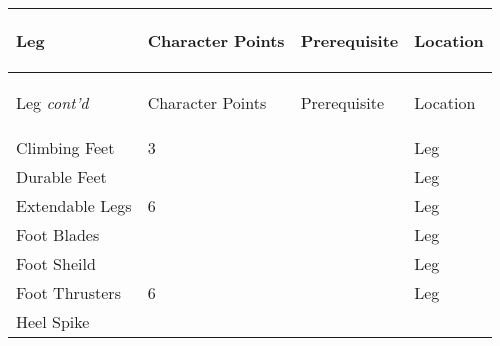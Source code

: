 \documentclass[twoside]{book}
\begin{document}
\begin{longtable}{p{1.25in}p{2em}ll} 
  Leg
  &
  \begin{turn}{70}{Character Points}\end{turn}
          
  &
  \begin{turn}{70}{Prerequisite}\end{turn}
          
  &
  \begin{turn}{70}{Location}\end{turn}
          
  \\
  \hline
  \hline
  \endfirsthead
  Leg \textit{cont'd}
        
  &
  \begin{turn}{70}{Character Points}\end{turn}
          
  &
  \begin{turn}{70}{Prerequisite}\end{turn}
          
  &
  \begin{turn}{70}{Location}\end{turn}
          
  \\
  \hline
  \endhead
      
  \raggedright
           Climbing Feet 
  &
   3 
  &
  
  &
   Leg 
  \tabularnewline
      
  \raggedright
           Durable Feet 
  &
  
  &
  
  &
   Leg 
  \tabularnewline
      
  \raggedright
           Extendable Legs 
  &
   6 
  &
  
  &
   Leg 
  \tabularnewline
      
  \raggedright
           Foot Blades 
  &
  
  &
  
  &
   Leg 
  \tabularnewline
      
  \raggedright
           Foot Sheild 
  &
  
  &
  
  &
   Leg 
  \tabularnewline
      
  \raggedright
           Foot Thrusters 
  &
   6 
  &
  
  &
   Leg 
  \tabularnewline
      
  \raggedright
           Heel Spike 
  &
  

\end{longtable}
\end{document}
